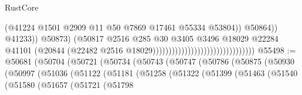 \begin{lexlean}{RustCore}
\begin{coremodule}
                                                                          (@41224
                                                                            @1501
                                                                            @2909
                                                                            @11
                                                                            @50
                                                                            @7869
                                                                            @17461
                                                                            @55334
                                                                            @53804))
                                                                        @50864))
                                                                    @41233))
                                                                @50873)
                                                              (@50817
                                                                @2516
                                                                @285
                                                                @30
                                                                @3405
                                                                @3496
                                                                @18029
                                                                @22284
                                                                @41101
                                                                (@20844
                                                                  (@22482
                                                                    @2516
                                                                    @18029))))))))))))))))))))))))))))))))
@55498 := @50681
    (@50704
      (@50721
        (@50734
          (@50743
            (@50747
              (@50786
                (@50875
                  (@50930
                    (@50997
                      (@51036
                        (@51122
                          (@51181
                            (@51258
                              (@51322
                                (@51399
                                  (@51463
                                    (@51540
                                      (@51580
                                        (@51657
                                          (@51721
                                            (@51798

\end{coremodule}
\end{lexlean}
